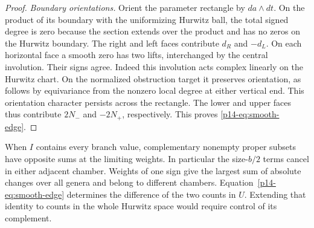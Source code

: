\begin{proof}
\emph{Boundary orientations.}
Orient the parameter rectangle by $da\wedge dt$. On the product of
its boundary with the uniformizing Hurwitz ball, the total signed
degree is zero because the section extends over the product and has
no zeros on the Hurwitz boundary. The right and left faces contribute
$d_R$ and $-d_L$. On each horizontal face a smooth zero has two
lifts, interchanged by the central involution. Their signs agree.
Indeed this involution acts complex linearly on the Hurwitz chart.
On the normalized obstruction target it preserves orientation,
as follows by equivariance from the nonzero local degree at either
vertical end. This orientation character persists across the
rectangle. The lower and upper faces thus contribute $2N_-$ and
$-2N_+$, respectively. This proves \eqref{p14-eq:smooth-edge}.
\end{proof}

When $I$ contains every branch value, complementary nonempty proper
subsets have opposite sums at the limiting weights. In particular the
size-$b/2$ terms cancel in either adjacent chamber. Weights of one
sign give the largest sum of absolute changes over all genera and
belong to different chambers. Equation~\eqref{p14-eq:smooth-edge}
determines the difference of the two counts in $U$. Extending that
identity to counts in the whole Hurwitz space would require control
of its complement.

